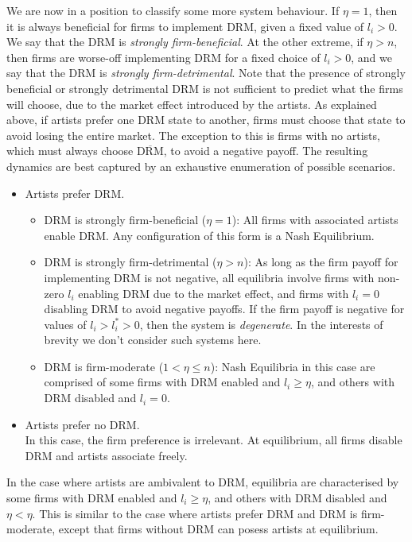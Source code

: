 \documentclass[a4paper,12pt]{article}
\numberwithin{equation}{section}
\newcommand{\drm}{\text{DRM}}
\newcommand{\nodrm}{\overline{\drm}}
\begin{document}
We are now in a position to classify some more system behaviour. If $\eta = 1$, then it is always beneficial for firms to implement DRM, given a fixed value of $l_i > 0$. We say that the DRM is \textit{strongly firm-beneficial}. At the other extreme, if $\eta > n$, then firms are worse-off implementing DRM for a fixed choice of $l_i > 0$, and we say that the DRM is \textit{strongly firm-detrimental}. Note that the presence of strongly beneficial or strongly detrimental DRM is not sufficient to predict what the firms will choose, due to the market effect introduced by the artists. As explained above, if artists prefer one DRM state to another, firms must choose that state to avoid losing the entire market. The exception to this is firms with no artists, which must always choose $\nodrm$, to avoid a negative payoff. The resulting dynamics are best captured by an exhaustive enumeration of possible scenarios.
\begin{itemize}
\item Artists prefer DRM.
	\begin{itemize}
	\item DRM is strongly firm-beneficial ($\eta = 1$): All firms with associated artists enable DRM. Any configuration of this form is a Nash Equilibrium.
	\item DRM is strongly firm-detrimental ($\eta > n$): As long as the firm payoff for implementing DRM is not negative, all equilibria involve firms with non-zero $l_i$ enabling DRM due to the market effect, and firms with $l_i = 0$ disabling DRM to avoid negative payoffs. If the firm payoff is negative for values of $l_i > l_i^* > 0$, then the system is \textit{degenerate}. In the interests of brevity we don't consider such systems here.
	\item DRM is firm-moderate ($1 < \eta \leq n$): Nash Equilibria in this case are comprised of some firms with DRM enabled and $l_i \geq \eta$, and others with DRM disabled and $l_i = 0$.
	\end{itemize}
\item Artists prefer no DRM.\\
In this case, the firm preference is irrelevant. At equilibrium, all firms disable DRM and artists associate freely.
\end{itemize}

In the case where artists are ambivalent to DRM, equilibria are characterised by some firms with DRM enabled and $l_i \geq \eta$, and others with DRM disabled and $\eta < \eta$. This is similar to the case where artists prefer DRM and DRM is firm-moderate, except that firms without DRM can posess artists at equilibrium.\\
\end{document}
